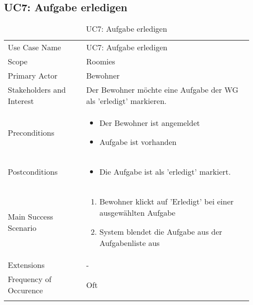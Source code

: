 \subsection{UC7: Aufgabe erledigen}
\begin{table}[H]
	\tablestyle
	\tablealtcolored
	\begin{tabularx}{\textwidth}{lX}
		\tablebody
			Use Case Name &
			UC7: Aufgabe erledigen
			\tabularnewline
			Scope &
			Roomies
			\tabularnewline
			Primary Actor &
			Bewohner
			\tabularnewline
			Stakeholders and Interest &
			Der Bewohner möchte eine Aufgabe der WG als 'erledigt' markieren.
			\tabularnewline
			Preconditions &
			\begin{itemize}
				\item Der Bewohner ist angemeldet
				\item Aufgabe ist vorhanden
			\end{itemize}
			\tabularnewline
			Postconditions &
			\begin{itemize}
				\item Die Aufgabe ist als 'erledigt' markiert.
			\end{itemize}
			\tabularnewline
			Main Success Scenario &
			\begin{enumerate}
				\item Bewohner klickt auf 'Erledigt' bei einer ausgewählten Aufgabe
				\item System blendet die Aufgabe aus der Aufgabenliste aus
			\end{enumerate}
			\tabularnewline
			Extensions &
			-
			\tabularnewline
			Frequency of Occurence &
			Oft
			\tabularnewline
		\tableend
	\end{tabularx}
	\caption{UC7: Aufgabe erledigen}
\end{table}


